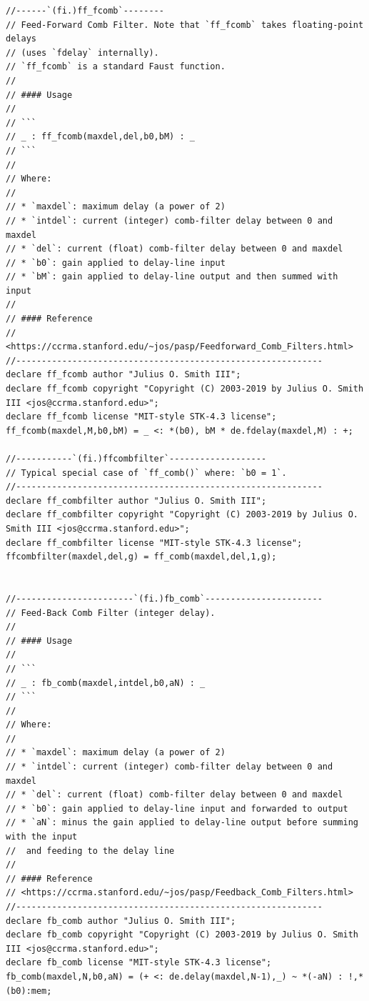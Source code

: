 \documentclass{article}
\begin{document}
\begin{lstlisting}[caption=\texttt{filters.lib}]
//------`(fi.)ff_fcomb`--------
// Feed-Forward Comb Filter. Note that `ff_fcomb` takes floating-point delays
// (uses `fdelay` internally).
// `ff_fcomb` is a standard Faust function.
//
// #### Usage
//
// ```
// _ : ff_fcomb(maxdel,del,b0,bM) : _
// ```
//
// Where:
//
// * `maxdel`: maximum delay (a power of 2)
// * `intdel`: current (integer) comb-filter delay between 0 and maxdel
// * `del`: current (float) comb-filter delay between 0 and maxdel
// * `b0`: gain applied to delay-line input
// * `bM`: gain applied to delay-line output and then summed with input
//
// #### Reference
// <https://ccrma.stanford.edu/~jos/pasp/Feedforward_Comb_Filters.html>
//------------------------------------------------------------
declare ff_fcomb author "Julius O. Smith III";
declare ff_fcomb copyright "Copyright (C) 2003-2019 by Julius O. Smith III <jos@ccrma.stanford.edu>";
declare ff_fcomb license "MIT-style STK-4.3 license";
ff_fcomb(maxdel,M,b0,bM) = _ <: *(b0), bM * de.fdelay(maxdel,M) : +;

//-----------`(fi.)ffcombfilter`-------------------
// Typical special case of `ff_comb()` where: `b0 = 1`.
//------------------------------------------------------------
declare ff_combfilter author "Julius O. Smith III";
declare ff_combfilter copyright "Copyright (C) 2003-2019 by Julius O. Smith III <jos@ccrma.stanford.edu>";
declare ff_combfilter license "MIT-style STK-4.3 license";
ffcombfilter(maxdel,del,g) = ff_comb(maxdel,del,1,g);


//-----------------------`(fi.)fb_comb`-----------------------
// Feed-Back Comb Filter (integer delay).
//
// #### Usage
//
// ```
// _ : fb_comb(maxdel,intdel,b0,aN) : _
// ```
//
// Where:
//
// * `maxdel`: maximum delay (a power of 2)
// * `intdel`: current (integer) comb-filter delay between 0 and maxdel
// * `del`: current (float) comb-filter delay between 0 and maxdel
// * `b0`: gain applied to delay-line input and forwarded to output
// * `aN`: minus the gain applied to delay-line output before summing with the input
// 	and feeding to the delay line
//
// #### Reference
// <https://ccrma.stanford.edu/~jos/pasp/Feedback_Comb_Filters.html>
//------------------------------------------------------------
declare fb_comb author "Julius O. Smith III";
declare fb_comb copyright "Copyright (C) 2003-2019 by Julius O. Smith III <jos@ccrma.stanford.edu>";
declare fb_comb license "MIT-style STK-4.3 license";
fb_comb(maxdel,N,b0,aN) = (+ <: de.delay(maxdel,N-1),_) ~ *(-aN) : !,*(b0):mem;



\end{lstlisting}
\end{document}

